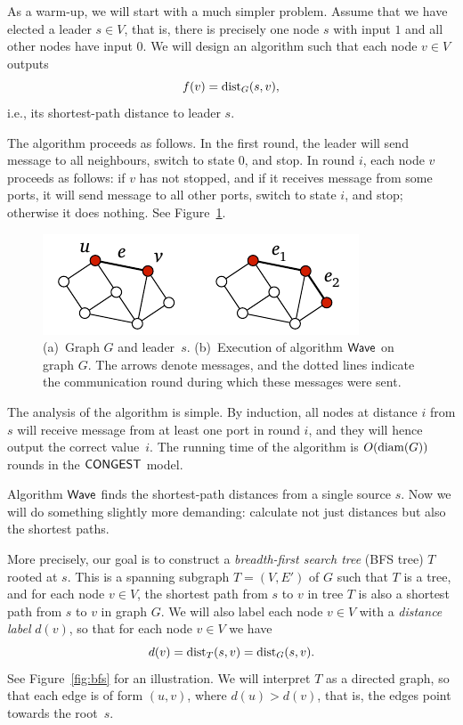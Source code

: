 \newcommand{\BFS}{\algo{BFS}}
\newcommand{\Wave}{\algo{Wave}}

\label{sec:wave}

As a warm-up, we will start with a much simpler problem. Assume that we have elected a leader $s \in V$, that is, there is precisely one node $s$ with input $1$ and all other nodes have input $0$. We will design an algorithm such that each node $v \in V$ outputs
\[
    f(v) = \operatorname{dist}_G(s,v),
\]
i.e., its shortest-path distance to leader $s$.

The algorithm proceeds as follows. In the first round, the leader will send message  to all neighbours, switch to state $0$, and stop. In round $i$, each node $v$ proceeds as follows: if $v$ has not stopped, and if it receives message  from some ports, it will send message  to all other ports, switch to state $i$, and stop; otherwise it does nothing. See Figure~\ref{fig:wave}.

\begin{figure}
    \centering
    \includegraphics[page=\PWave]{figs.pdf}
    \caption{(a)~Graph $G$ and leader~$s$. (b)~Execution of algorithm $\Wave$ on graph $G$. The arrows denote  messages, and the dotted lines indicate the communication round during which these messages were sent.}\label{fig:wave}
\end{figure}

The analysis of the algorithm is simple. By induction, all nodes at distance $i$ from $s$ will receive message  from at least one port in round $i$, and they will hence output the correct value~$i$. The running time of the algorithm is $O(\operatorname{diam}(G))$ rounds in the $\textup{\sffamily CONGEST}$ model.


\label{sec:bfs}

Algorithm $\Wave$ finds the shortest-path distances from a single source $s$. Now we will do something slightly more demanding: calculate not just distances but also the shortest paths.

More precisely, our goal is to construct a \emph{breadth-first search tree} (BFS tree) $T$ rooted at $s$. This is a spanning subgraph $T = (V,E')$ of $G$ such that $T$ is a tree, and for each node $v \in V$, the shortest path from $s$ to $v$ in tree $T$ is also a shortest path from $s$ to $v$ in graph $G$. We will also label each node $v \in V$ with a \emph{distance label} $d(v)$, so that for each node $v \in V$ we have
\[
    d(v) = \operatorname{dist}_T(s,v) = \operatorname{dist}_G(s,v).
\]
See Figure~\ref{fig:bfs} for an illustration. We will interpret $T$ as a directed graph, so that each edge is of form $(u,v)$, where $d(u) > d(v)$, that is, the edges point towards the root~$s$.

